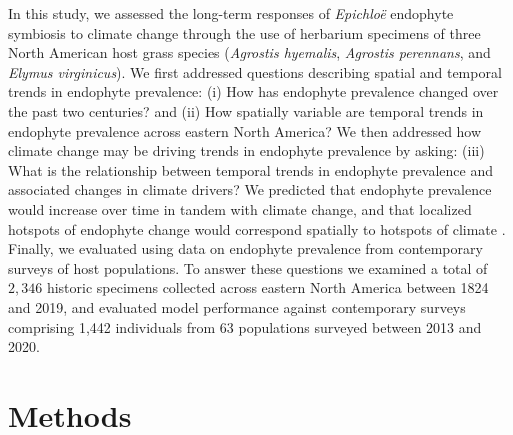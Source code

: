 \documentclass[11pt]{article}
\newcommand{\firstrevise}[1]{{\color{black}{#1}}}
\begin{document}
In this study, we assessed the long-term responses of \emph{Epichloë} endophyte symbiosis to climate change through the use of herbarium specimens of three North American host grass species (\emph{Agrostis hyemalis}, \emph{Agrostis perennans}, and \emph{Elymus virginicus}).
We first addressed questions describing spatial and temporal trends in endophyte prevalence: (i) How has endophyte prevalence changed over the past two centuries? and (ii) How spatially variable are temporal trends in endophyte prevalence across eastern North America?
We then addressed how climate change may be driving trends in endophyte prevalence by asking: (iii) What is the relationship between temporal trends in endophyte prevalence and associated changes in climate drivers?
We predicted that \firstrevise{overall} endophyte prevalence would increase over time in tandem with climate change, and that localized hotspots of endophyte change would correspond spatially to hotspots of climate \firstrevise{warming and drying}. 
Finally, we evaluated \firstrevise{(iv) how our model, built on data from historic specimens, performed in an out-of-sample test }using data on endophyte prevalence from contemporary surveys of host populations. 
To answer these questions we examined a total of $2,346$ historic specimens collected across eastern North America between 1824 and 2019, and evaluated model performance against contemporary surveys comprising 1,442 individuals from 63 populations surveyed between 2013 and 2020.
	
\section*{Methods}
\end{document}

